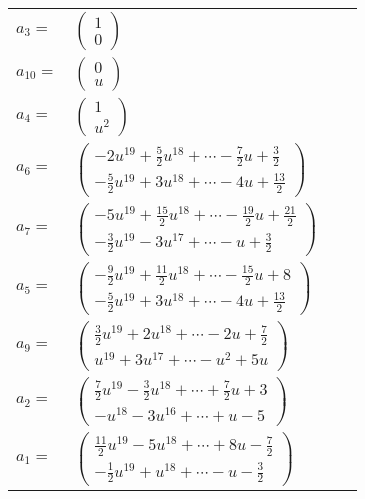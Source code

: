 \documentclass[1p]{elsarticle_modified}
\theoremstyle{definition}
\begin{document}
\begin{tabular}{m{7pt} m{180pt} m{7pt} m{180pt} }
\flushright $a_{3}=$&$\begin{pmatrix}1\\0\end{pmatrix}$ \\
\flushright $a_{10}=$&$\begin{pmatrix}0\\u\end{pmatrix}$ \\
\flushright $a_{4}=$&$\begin{pmatrix}1\\u^2\end{pmatrix}$ \\
\flushright $a_{6}=$&$\begin{pmatrix}-2 u^{19}+\frac{5}{2} u^{18}+\cdots-\frac{7}{2} u+\frac{3}{2}\\-\frac{5}{2} u^{19}+3 u^{18}+\cdots-4 u+\frac{13}{2}\end{pmatrix}$ \\
\flushright $a_{7}=$&$\begin{pmatrix}-5 u^{19}+\frac{15}{2} u^{18}+\cdots-\frac{19}{2} u+\frac{21}{2}\\-\frac{3}{2} u^{19}-3 u^{17}+\cdots- u+\frac{3}{2}\end{pmatrix}$ \\
\flushright $a_{5}=$&$\begin{pmatrix}-\frac{9}{2} u^{19}+\frac{11}{2} u^{18}+\cdots-\frac{15}{2} u+8\\-\frac{5}{2} u^{19}+3 u^{18}+\cdots-4 u+\frac{13}{2}\end{pmatrix}$ \\
\flushright $a_{9}=$&$\begin{pmatrix}\frac{3}{2} u^{19}+2 u^{18}+\cdots-2 u+\frac{7}{2}\\u^{19}+3 u^{17}+\cdots- u^2+5 u\end{pmatrix}$ \\
\flushright $a_{2}=$&$\begin{pmatrix}\frac{7}{2} u^{19}-\frac{3}{2} u^{18}+\cdots+\frac{7}{2} u+3\\- u^{18}-3 u^{16}+\cdots+u-5\end{pmatrix}$ \\
\flushright $a_{1}=$&$\begin{pmatrix}\frac{11}{2} u^{19}-5 u^{18}+\cdots+8 u-\frac{7}{2}\\-\frac{1}{2} u^{19}+u^{18}+\cdots- u-\frac{3}{2}\end{pmatrix}$ \\

\end{tabular}
\end{document}
